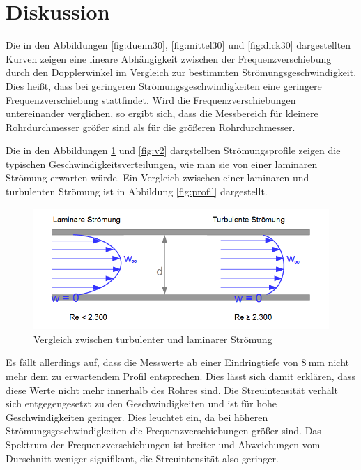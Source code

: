 \section{Diskussion}
\label{sec:Diskussion}

Die in den Abbildungen \ref{fig:duenn30}, \ref{fig:mittel30} und \ref{fig:dick30} dargestellten Kurven zeigen eine lineare Abhängigkeit zwischen der Frequenzverschiebung durch den Dopplerwinkel im Vergleich zur bestimmten Strömungsgeschwindigkeit.
Dies heißt, dass bei geringeren Strömungsgeschwindigkeiten eine geringere Frequenzverschiebung stattfindet.
Wird die Frequenzverschiebungen untereinander verglichen, so ergibt sich, dass die Messbereich für kleinere Rohrdurchmesser größer sind als für die größeren Rohrdurchmesser.

Die in den Abbildungen \ref{fig:v1} und \ref{fig:v2} dargstellten Strömungsprofile zeigen die typischen Geschwindigkeitsverteilungen, wie man sie von einer laminaren Strömung erwarten würde.
Ein Vergleich zwischen einer laminaren und turbulenten Strömung ist in Abbildung \ref{fig:profil} dargestellt.

\begin{figure}
  \centering
  \includegraphics[width=\textwidth]{images/Stroemungsprofil.png}
  \caption{Vergleich zwischen turbulenter und laminarer Strömung \cite{profil}}
  \label{fig:v1}
\end{figure}

Es fällt allerdings auf, dass die Messwerte ab einer Eindringtiefe von $\SI{8}{\milli\metre}$ nicht mehr dem zu erwartendem Profil entsprechen.
Dies lässt sich damit erklären, dass diese Werte nicht mehr innerhalb des Rohres sind.
Die Streuintensität verhält sich entgegengesetzt zu den Geschwindigkeiten und ist für hohe Geschwindigkeiten geringer.
Dies leuchtet ein, da bei höheren Strömungsgeschwindigkeiten die Frequenzverschiebungen größer sind.
Das Spektrum der Frequenzverschiebungen ist breiter und Abweichungen vom Durschnitt weniger signifikant, die Streuintensität also geringer.
